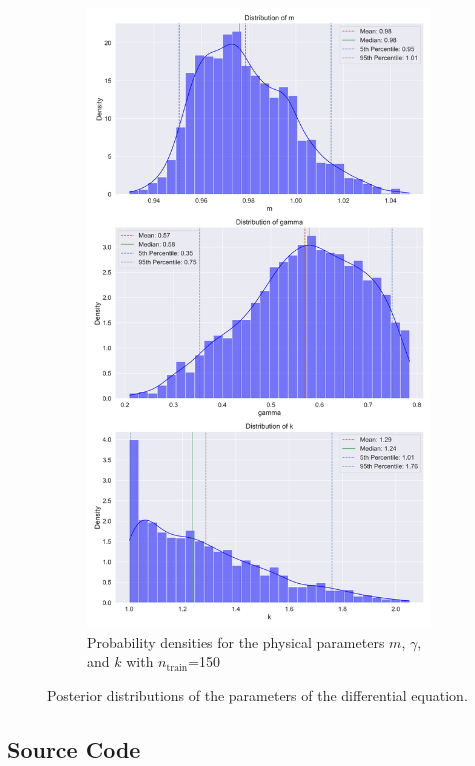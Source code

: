 \documentclass{article}
\newcommand{\nt}{$n_\text{train}$}
\begin{document}
\begin{figure}[htbp!]
    \hfill
    \begin{subfigure}[b]{0.45\textwidth}
        \centering
        \includegraphics[width=\textwidth]{plots/BPINN/oscilator1_150_[20, 20, 1]_combined_distribution.png}
        \caption{Probability densities for the physical parameters \( m \), \( \gamma  \), and \( k \) with \nt=150}
        \label{fig:plot2}
    \end{subfigure} 
    \caption{Posterior distributions of the parameters of the differential equation.}
    \label{fig:post_dens_params}
\end{figure}
\newpage
\printbibliography
\newpage
\begin{appendices}
\section{Source Code}




\end{appendices}
\end{document}
